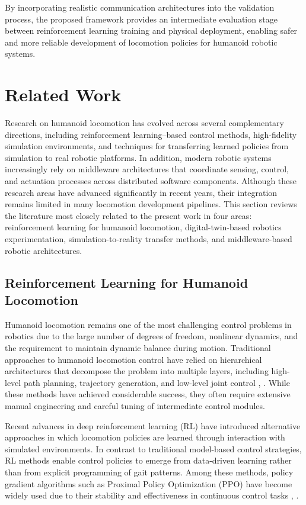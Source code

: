 \documentclass[pdflatex,sn-mathphys-num]{sn-jnl}%
\theoremstyle{thmstyleone}%
\theoremstyle{thmstyletwo}%
\theoremstyle{thmstylethree}%
\begin{document}
By incorporating realistic communication architectures into the validation process, the proposed framework provides an intermediate evaluation stage between reinforcement learning training and physical deployment, enabling safer and more reliable development of locomotion policies for humanoid robotic systems.

\section{Related Work}
\label{RelatedWork}

Research on humanoid locomotion has evolved across several complementary directions, including reinforcement learning–based control methods, high-fidelity simulation environments, and techniques for transferring learned policies from simulation to real robotic platforms. In addition, modern robotic systems increasingly rely on middleware architectures that coordinate sensing, control, and actuation processes across distributed software components. Although these research areas have advanced significantly in recent years, their integration remains limited in many locomotion development pipelines. This section reviews the literature most closely related to the present work in four areas: reinforcement learning for humanoid locomotion, digital-twin-based robotics experimentation, simulation-to-reality transfer methods, and middleware-based robotic architectures.

\subsection{Reinforcement Learning for Humanoid Locomotion}
Humanoid locomotion remains one of the most challenging control problems in robotics due to the large number of degrees of freedom, nonlinear dynamics, and the requirement to maintain dynamic balance during motion. Traditional approaches to humanoid locomotion control have relied on hierarchical architectures that decompose the problem into multiple layers, including high-level path planning, trajectory generation, and low-level joint control \cite{bib1}, \cite{bib2}. While these methods have achieved considerable success, they often require extensive manual engineering and careful tuning of intermediate control modules.

Recent advances in deep reinforcement learning (RL) have introduced alternative approaches in which locomotion policies are learned through interaction with simulated environments. In contrast to traditional model-based control strategies, RL methods enable control policies to emerge from data-driven learning rather than from explicit programming of gait patterns. Among these methods, policy gradient algorithms such as Proximal Policy Optimization (PPO) have become widely used due to their stability and effectiveness in continuous control tasks \cite{bib4}, \cite{bib5}.
\end{document}
